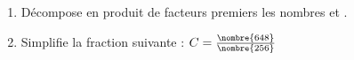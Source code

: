 
\begin{enumerate}
\item Décompose en produit de facteurs premiers les nombres  et . 
\item Simplifie la fraction suivante :
$C=\frac{\nombre{648}}{\nombre{256}}$
\end{enumerate}
